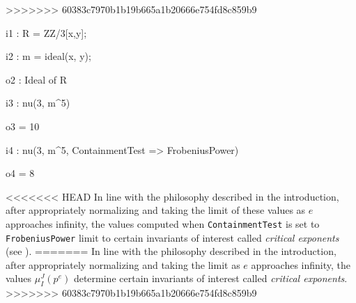 \documentclass{amsart}
\begin{document}
>>>>>>> 60383c7970b1b19b665a1b20666e754fd8c859b9
{\small
{}
\begin{MyVerbatim}

i1 : R = ZZ/3[x,y];

i2 : m = ideal(x, y);

o2 : Ideal of R

i3 : nu(3, m^5)

o3 = 10

i4 : nu(3, m^5, ContainmentTest => FrobeniusPower)

o4 = 8
\end{MyVerbatim}
}

\medspace
<<<<<<< HEAD
\noindent In line with the philosophy described in the introduction, after appropriately normalizing and taking the limit of these values as $e$ approaches infinity, the values computed when {\tt ContainmentTest} is set to {\tt FrobeniusPower}
limit to certain invariants of interest called \emph{critical exponents} (see \cite{hernandez+etal.frobenius_powers}).
=======
\noindent In line with the philosophy described in the introduction, after appropriately normalizing and taking the limit as $e$ approaches infinity, the values $\mu_I^J(p^e)$ determine certain invariants of interest called \emph{critical exponents}. 
>>>>>>> 60383c7970b1b19b665a1b20666e754fd8c859b9








\end{document}
